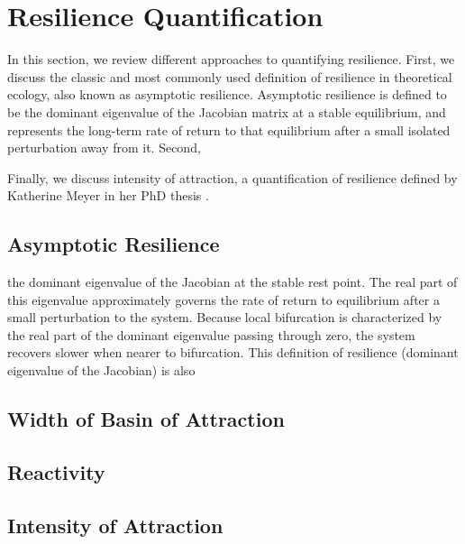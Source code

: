 \section{Resilience Quantification}
\label{sec:resilience}

In this section, we review different approaches to quantifying resilience. 
%
First, we discuss the classic and most commonly used definition of resilience in theoretical ecology, also known as asymptotic resilience. Asymptotic resilience is defined to be the dominant eigenvalue of the Jacobian matrix at a stable equilibrium, and represents the long-term rate of return to that equilibrium after a small isolated perturbation away from it. 
%
Second, 


%
Finally, we discuss intensity of attraction, a quantification of resilience defined by Katherine Meyer in her PhD thesis \cite{meyerMetricPropertiesAttractors2019}. 


\subsection{Asymptotic Resilience}

 the dominant eigenvalue of the Jacobian at the stable rest point. The real part of this eigenvalue approximately governs the rate of return to equilibrium after a small perturbation to the system. Because local bifurcation is characterized by the real part of the dominant eigenvalue passing through zero, the system recovers slower when nearer to bifurcation. This definition of resilience (dominant eigenvalue of the Jacobian) is also

\subsection{Width of Basin of Attraction}

\subsection{Reactivity}

\subsection{Intensity of Attraction}
